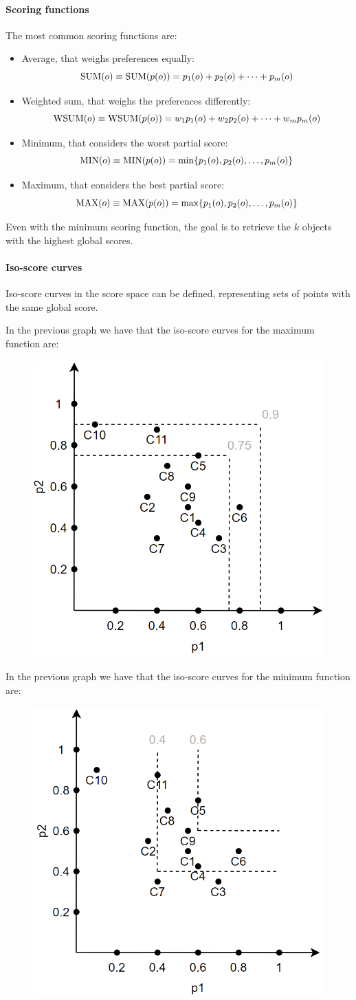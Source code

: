 \paragraph*{Scoring functions}
The most common scoring functions are: 
\begin{itemize}
    \item Average, that weighs preferences equally: 
        \[\textnormal{SUM}(o) \equiv \textnormal{SUM}(p(o)) = p_1(o) + p_2(o) + \dots + p_m(o)\]
    \item Weighted sum, that weighs the preferences differently:
        \[\textnormal{WSUM}(o) \equiv \textnormal{WSUM}(p(o)) = w_1p_1(o) + w_2p_2(o) + \dots + w_mp_m(o)\]
    \item Minimum, that considers the worst partial score: 
        \[\textnormal{MIN}(o) \equiv \textnormal{MIN}(p(o)) = \min\{p_1(o),p_2(o),\dots, p_m(o)\}\]
    \item Maximum, that considers the best partial score: 
        \[\textnormal{MAX}(o) \equiv \textnormal{MAX}(p(o)) = \max\{p_1(o),p_2(o),\dots, p_m(o)\}\]       
\end{itemize}
Even with the minimum scoring function, the goal is to retrieve the $k$ objects with the highest global scores.

\paragraph*{Iso-score curves}
Iso-score curves in the score space can be defined, representing sets of points with the same global score.
\begin{example}
    In the previous graph we have that the iso-score curves for the maximum function are: 
    \begin{figure}[H]
        \centering
        \includegraphics[width=0.3\linewidth]{images/iso.png}
    \end{figure}
    In the previous graph we have that the iso-score curves for the minimum function are: 
    \begin{figure}[H]
        \centering
        \includegraphics[width=0.3\linewidth]{images/isomin.png}
    \end{figure}
\end{example}

